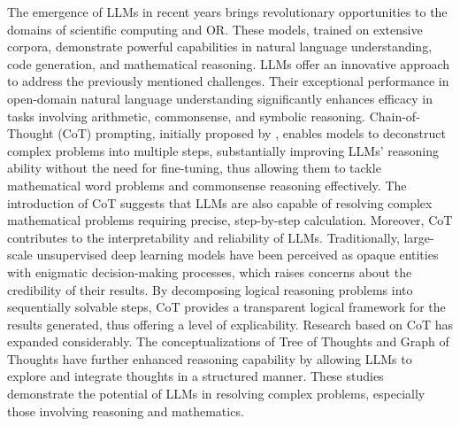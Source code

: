 \documentclass[preprint,12pt]{elsarticle}
\begin{document}
The emergence of LLMs in recent years brings revolutionary opportunities to the domains of scientific computing and OR. These models, trained on extensive corpora, demonstrate powerful capabilities in natural language understanding, code generation, and mathematical reasoning. LLMs offer an innovative approach to address the previously mentioned challenges. Their exceptional performance in open-domain natural language understanding significantly enhances efficacy in tasks involving arithmetic, commonsense, and symbolic reasoning. Chain-of-Thought (CoT) prompting, initially proposed by \cite{weiChainofThoughtPromptingElicits2023}, enables models to deconstruct complex problems into multiple steps, substantially improving LLMs' reasoning ability without the need for fine-tuning, thus allowing them to tackle mathematical word problems and commonsense reasoning effectively. The introduction of CoT suggests that LLMs are also capable of resolving complex mathematical problems requiring precise, step-by-step calculation. Moreover, CoT contributes to the interpretability and reliability of LLMs. Traditionally, large-scale unsupervised deep learning models have been perceived as opaque entities with enigmatic decision-making processes, which raises concerns about the credibility of their results. By decomposing logical reasoning problems into sequentially solvable steps, CoT provides a transparent logical framework for the results generated, thus offering a level of explicability. Research based on CoT has expanded considerably. The conceptualizations of Tree of Thoughts \cite{yaoTreeThoughtsDeliberate2023} and Graph of Thoughts \cite{bestaGraphThoughtsSolving2024} have further enhanced reasoning capability by allowing LLMs to explore and integrate thoughts in a structured manner. These studies demonstrate the potential of LLMs in resolving complex problems, especially those involving reasoning and mathematics.
\end{document}
